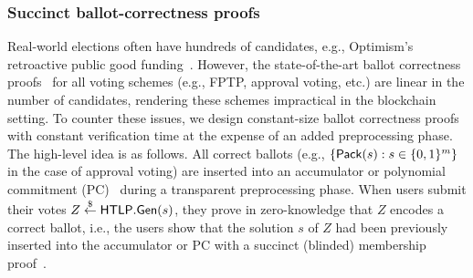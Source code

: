 

\subsubsection{Succinct ballot-correctness proofs}\label{sec:succinct_ballot_correctness}

Real-world elections often have hundreds of candidates, e.g., Optimism's retroactive public good funding~\cite{retropgf_voterguide}. However, the state-of-the-art ballot correctness proofs~\cite{C:BBCGI23,ACNS:Groth05} for all voting schemes (e.g., FPTP, approval voting, etc.) are linear in the number of candidates, rendering these schemes impractical in the blockchain setting. To counter these issues, we design constant-size ballot correctness proofs with constant verification time at the expense of an added preprocessing phase. The high-level idea is as follows. All correct ballots (e.g., $\{ \mathsf{Pack}(s) : s\in\{0,1\}^{m}\}$ in the case of approval voting) are inserted into an accumulator or polynomial commitment (PC)~\cite{AC:KatZavGol10} during a transparent preprocessing phase. When users submit their votes $Z \stackrel{\$}{\gets} \mathsf{HTLP}.\mathsf{Gen}(s)$, they prove in zero-knowledge that $Z$ encodes a correct ballot, i.e., the users show that the solution $s$ of $Z$ had been previously inserted into the accumulator or PC with a succinct (blinded) membership proof~\cite{CCS:ZBKMNS22}.

